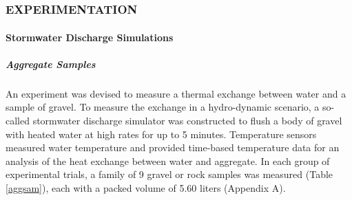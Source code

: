 \documentclass[12pt]{article}
\numberwithin{equation}{section}
\numberwithin{table}{section}
\numberwithin{figure}{section}
\begin{document}

\thispagestyle{empty}
\section*{}


%

\setcounter{page}{3}

\pagestyle{plain} 




\tableofcontents
\listoffigures
\listoftables

\part*{}

%


\section{EXPERIMENTATION}

\subsection{Stormwater Discharge Simulations}

\subsubsection{Aggregate Samples}
An experiment was devised to measure a thermal exchange between water and a sample of gravel. To measure the exchange in a hydro-dynamic scenario, a so-called stormwater discharge simulator was constructed to flush a body of gravel with heated water at high rates for up to 5 minutes. Temperature sensors measured water temperature and provided time-based temperature data for an analysis of the heat exchange between water and aggregate. In each group of experimental trials, a family of 9 gravel or rock samples was measured (Table \ref{aggsam}), each with a packed volume of 5.60 liters (Appendix A). 
\end{document}
